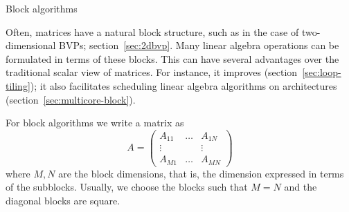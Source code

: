 
\begin{comment}
\Level 1 {Accuracy}

In section \ref{sec:linear-arith} you saw some simple examples of the
problems that stem from the use of computer arithmetic, and how these
motivated the use of pivoting. Even with pivoting, however, we still
need to worry about the accumulated effect of roundoff
errors. A~productive way of looking at the question of attainable
accuracy is to consider that by solving a system $Ax=b$ we get
a numerical solution $x+\Delta x$ which is the exact solution of a
slightly different linear system: 
\[ (A+\Delta A)(x+\Delta x)=b+\Delta b. \]
Analyzing these statements quickly leads to bounds such as 
\[ \frac{\|\Delta x\|}{\|x\|}\leq 
  \frac{2\epsilon \kappa(A)}{1-\epsilon\kappa(A)} 
\]
where $\epsilon$ is the \indexterm{machine precision} (see
section~\ref{sec:machine-eps}) and $\kappa(A)=\|A\|\|A\inv\|$ is
called the \indexterm{condition number} of the matrix~$A$ (see
appendix~\ref{app:norms}). Without going into this in any detail, we
remark that the condition number is related to eigenvalues (strictly
speaking: singular values) of the
matrix.

The analysis of the accuracy of algorithms is a field of study in
itself; see for instance the book by Higham~\cite{Higham:2002:ASN}.
\end{comment}

 {Block algorithms}
\label{sec:block-algebra}

Often, matrices have a natural block structure, such as in the case of
two-dimensional \ac{BVP}s; section~\ref{sec:2dbvp}. Many linear
algebra operations can be formulated in terms of these blocks.  This
can have several advantages over the traditional scalar view of
matrices. For instance, it improves 
(section~\ref{sec:loop-tiling}); it also facilitates scheduling linear
algebra algorithms on  architectures
(section~\ref{sec:multicore-block}).

For block algorithms
we write a matrix as 
\[ A=
\begin{pmatrix}
  A_{11}&\ldots&A_{1N}\\ \vdots&&\vdots\\ A_{M1}&\ldots&A_{MN}
\end{pmatrix}
\] 
where $M,N$ are the block dimensions, that is, the dimension expressed
in terms of the subblocks. Usually, we choose the blocks such that
$M=N$ and the diagonal blocks are square.

